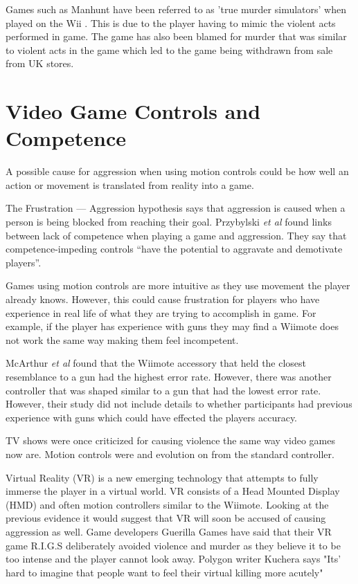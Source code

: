 \documentclass{scrartcl}
\begin{document}
Games such as Manhunt have been referred to as 'true murder simulators' when played on the Wii \cite{Manhunt}. This is due to the player having to mimic the violent acts performed in game.
The game has also been blamed for murder that was similar to violent acts in the game which led to the game being withdrawn from sale from UK stores. \cite{Manhunt2Ban, ManhuntMurder}


\section{Video Game Controls and Competence}
A possible cause for aggression when using motion controls could be how well an action or movement is translated from reality into a game.  

The Frustration --- Aggression hypothesis says that aggression is caused when a person is being blocked from reaching their goal. \cite{dollard1939frustration}  Przybylski \textit{et al} found links between lack of competence when playing a game and aggression. They say that competence-impeding controls ``have the potential to aggravate and demotivate players”. \cite{przybylski}

Games using motion controls are more intuitive as they use movement the player already knows. \cite{Kim} However, this could cause frustration for players who have experience in real life of what they are trying to accomplish in game. For example, if the player has experience with guns they may find a Wiimote does not work the same way making them feel incompetent. 

McArthur \textit{et al}  found that the Wiimote accessory that held the closest resemblance to a gun had the highest error rate. However, there was another controller that was shaped similar to a gun that had the lowest error rate. \cite{McArthur}  However, their study did not include details to whether participants had previous experience with guns which could have effected the players accuracy. 

 
\bigskip

TV shows were once criticized for causing violence the same way video games now are. \cite{sherry2001effects} 
Motion controls were and evolution on from the standard controller.

Virtual Reality (VR) is a new emerging technology that attempts to fully immerse the player in a virtual world. VR consists of a Head Mounted Display (HMD) and often motion controllers similar to the Wiimote.
Looking at the previous evidence it would suggest that VR will soon be accused of causing aggression as well. Game developers Guerilla Games have said that their VR game R.I.G.S deliberately avoided violence and murder as they believe it to be too intense and the player cannot look away. \cite{VRViolence}
Polygon writer Kuchera says "Its' hard to imagine that people want to feel their virtual killing more acutely" \cite{PolygonVR} 
\end{document}
